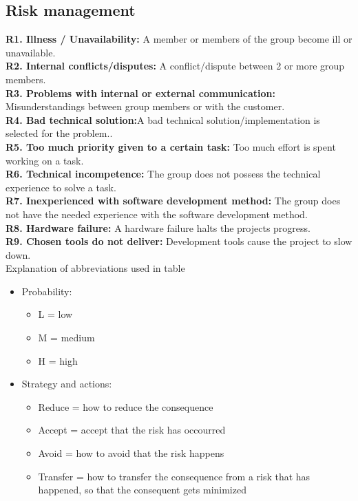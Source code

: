 

\subsection{Risk management}

\textbf{R1. Illness / Unavailability:} A member or members of the group become ill or unavailable. \\
\textbf{R2. Internal conflicts/disputes:} A conflict/dispute between 2 or more group members. \\
\textbf{R3. Problems with internal or external communication:} Misunderstandings between group members or with the customer. \\
\textbf{R4. Bad technical solution:}A bad technical solution/implementation is selected for the problem.. \\
\textbf{R5. Too much priority given to a certain task:} Too much effort is spent working on a task. \\
\textbf{R6. Technical incompetence:} The group does not possess the technical experience to solve a task. \\
\textbf{R7. Inexperienced with software development method:} The group does not have the needed experience with the software development method. \\
\textbf{R8. Hardware failure:} A hardware failure halts the projects progress. \\
\textbf{R9. Chosen tools do not deliver:} Development tools cause the project to slow down. \\

Explanation of abbreviations used in table%
\begin{itemize}
\item{}Probability:
\begin{itemize}
\item{}L = low
\item{}M = medium
\item{}H = high
\end{itemize}
\item{}Strategy and actions:
\begin{itemize}
\item{}Reduce = how to reduce the consequence
\item{}Accept = accept that the risk has occourred
\item{}Avoid = how to avoid that the risk happens
\item{}Transfer = how to transfer the consequence from a risk that has happened, so that the consequent gets minimized
\end{itemize}
\end{itemize}

